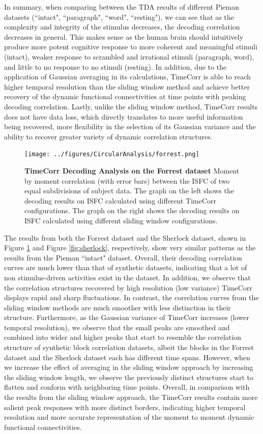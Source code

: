 \documentclass[11pt]{article}
\begin{document}
In summary, when comparing between the TDA results of different Pieman datasets (``intact", ``paragraph", ``word", ``resting"), we can see that as the complexity and integrity of the stimulus decreases, the decoding correlation decreases in general. This makes sense as the human brain should intuitively produce more potent cognitive response to more coherent and meaningful stimuli (intact), weaker response to scrambled and irrational stimuli (paragraph, word), and little to no response to no stimuli (resting). In addition, due to the application of Gaussian averaging in its calculations, TimeCorr is able to reach higher temporal resolution than the sliding window method and achieve better recovery of the dynamic functional connectivities at time points with peaking decoding correlation. Lastly, unlike the sliding window method, TimeCorr results does not have data loss, which directly translates to more useful information being recovered, more flexibility in the selection of its Gaussian variance and the ability to recover greater variety of dynamic correlation structures.

\begin{figure}[!htb]
\texttt{[image: ../figures/CircularAnalysis/forrest.png]}
\caption{\textbf{TimeCorr Decoding Analysis on the Forrest dataset} Moment by moment correlation (with error bars) between the ISFC of two equal subdivisions of subject data. The graph on the left shows the decoding results on ISFC calculated using different TimeCorr configurations. The graph on the right shows the decoding results on ISFC calculated using different sliding window configurations.}
\label{fig:forrest}
\end{figure}

The results from both the Forrest dataset and the Sherlock dataset, shown in Figure \ref{fig:forrest} and Figure \ref{fig:sherlock}, respectively, show very similar patterns as the results from the Pieman ``intact" dataset. Overall, their decoding correlation curves are much lower than that of synthetic datasets, indicating that a lot of non stimulus-driven activities exist in the dataset. In addition, we observe that the correlation structures recovered by high resolution (low variance) TimeCorr displays rapid and sharp fluctuations. In contrast, the correlation curves from the sliding window methods are much smoother with less distinction in their structure. Furthermore, as the Gaussian variance of TimeCorr increases (lower temporal resolution), we observe that the small peaks are smoothed and combined into wider and higher peaks that start to resemble the correlation structure of synthetic block correlation datasets, albeit the blocks in the Forrest dataset and the Sherlock dataset each has different time spans. However, when we increase the effect of averaging in the sliding window approach by increasing the sliding window length, we observe the previously distinct structures start to flatten and conform with neighboring time points. Overall, in comparison with the results from the sliding window approach, the TimeCorr results contain more salient peak responses with more distinct borders, indicating higher temporal resolution and more accurate representation of the moment to moment dynamic functional connectivities.
\end{document}
